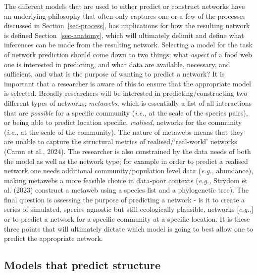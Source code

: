 \documentclass[
]{article}
\begin{document}
The different models that are used to either predict or construct
networks have an underlying philosophy that often only captures one or a
few of the processes discussed in Section~\ref{sec-process}, has
implications for how the resulting network is defined
Section~\ref{sec-anatomy}, which will ultimately delimit and define what
inferences can be made from the resulting network. Selecting a model for
the task of network prediction should come down to two things; what
\emph{aspect} of a food web one is interested in predicting, and what
data are available, necessary, and sufficient, and what is the purpose
of wanting to predict a network? It is important that a researcher is
aware of this to ensure that the appropriate model is selected. Broadly
researchers will be interested in predicting/constructing two different
types of networks; \emph{metawebs}, which is essentially a list of all
interactions that are \emph{possible} for a specific community
(\emph{i.e.,} at the scale of the species pairs), or being able to
predict location specific, \emph{realised}, networks for the community
(\emph{i.e.,} at the scale of the community). The nature of metawebs
means that they are unable to capture the structural metrics of
realised/`real-world' networks (Caron et al., 2024). The researcher is
also constrained by the data needs of both the model as well as the
network type; for example in order to predict a realised network one
needs additional community/population level data (\emph{e.g.,}
abundance), making metawebs a more feasible choice in data-poor contexts
(\emph{e.g.,} Strydom et al. (2023) construct a metaweb using a species
list and a phylogenetic tree). The final question is assessing the
purpose of predicting a network - is it to create a series of simulated,
species agnostic but still ecologically plausible, networks
{[}\emph{e.g.,}{]} or to predict a network for a specific community at a
specific location. It is these three points that will ultimately dictate
which model is going to best allow one to predict the appropriate
network.

\subsection{Models that predict structure}\label{sec-network-build}
\end{document}
